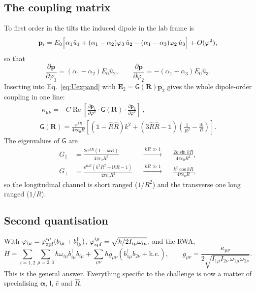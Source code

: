 \documentclass[11pt,a4paper]{article}
\newcommand{\ee}{\mathrm{e}}
\newcommand{\ii}{\mathrm{i}}
\newcommand{\bal}{\boldsymbol{\alpha}}
\newcommand{\Gsf}{\mathsf{G}}
\begin{document}
\subsection{The coupling matrix}

To first order in the tilts the induced dipole in the lab frame is
\begin{equation}
  \mathbf p_i=E_0\Bigl[\alpha_1\hat u_1
  +(\alpha_1-\alpha_2)\varphi_3\,\hat u_2
  -(\alpha_1-\alpha_3)\varphi_2\,\hat u_3\Bigr]+O(\varphi^{2}),
  \label{eq:dpdphi}
\end{equation}
so that
\begin{equation}
  \frac{\partial\mathbf p}{\partial\varphi_3}=(\alpha_1-\alpha_2)E_0\hat u_2,
  \qquad
  \frac{\partial\mathbf p}{\partial\varphi_2}=-(\alpha_1-\alpha_3)E_0\hat u_3 .
  \label{eq:dpdphi2}
\end{equation}
Inserting into Eq.~\eqref{eq:Uexpand} with $\mathbf E_2=\Gsf(\mathbf R)\mathbf p_2$
gives the whole dipole-order coupling in one line:
\begin{gather}
  \boxed{\;
  \kappa_{\mu\nu}=-C\operatorname{Re}
  \left[\frac{\partial\mathbf p_1}{\partial\varphi^{\mu}}\cdot
  \Gsf(\mathbf R)\cdot
  \frac{\partial\mathbf p_2}{\partial\varphi^{\nu}}\right]\;},
  \label{eq:kappa}\\[4pt]
  \Gsf(\mathbf R)=\frac{\ee^{\ii kR}}{4\pi\epsilon_0R}
  \left[\left(\mathbb 1-\hat R\hat R\right)k^{2}
  +\left(3\hat R\hat R-\mathbb 1\right)
  \left(\frac{1}{R^{2}}-\frac{\ii k}{R}\right)\right].
  \label{eq:Gdyad}
\end{gather}
The eigenvalues of $\Gsf$ are
\begin{align}
  G_{\parallel}&=\frac{2\ee^{\ii kR}(1-\ii kR)}{4\pi\epsilon_0R^{3}}
  &&\xrightarrow{\ kR\gg1\ }&&\frac{2k\sin kR}{4\pi\epsilon_0R^{2}},
  \label{eq:Gpar}\\
  G_{\perp}&=\frac{\ee^{\ii kR}(k^{2}R^{2}+\ii kR-1)}{4\pi\epsilon_0R^{3}}
  &&\xrightarrow{\ kR\gg1\ }&&\frac{k^{2}\cos kR}{4\pi\epsilon_0R},
  \label{eq:Gperp}
\end{align}
so the longitudinal channel is short ranged ($1/R^{2}$) and the transverse one
long ranged ($1/R$).

\subsection{Second quantisation}

With $\varphi_{i\mu}=\varphi_{\rm zpf}^{i\mu}(b_{i\mu}+b_{i\mu}^{\dagger})$,
$\varphi_{\rm zpf}^{i\mu}=\sqrt{\hbar/2I_{i\mu}\omega_{i\mu}}$, and the RWA,
\begin{equation}
  H=\sum_{i=1,2}\sum_{\mu=2,3}\hbar\omega_{i\mu}b_{i\mu}^{\dagger}b_{i\mu}
   +\sum_{\mu\nu}\hbar g_{\mu\nu}
    \left(b_{1\mu}^{\dagger}b_{2\nu}+\mathrm{h.c.}\right),
  \qquad
  g_{\mu\nu}=\frac{\kappa_{\mu\nu}}
  {2\sqrt{I_{1\mu}I_{2\nu}\,\omega_{1\mu}\omega_{2\nu}}} .
  \label{eq:Hgen}
\end{equation}
This is the general answer.  Everything specific to the challenge is now a
matter of specialising $\bal$, $\mathsf I$, $\hat e$ and $\hat R$.
\end{document}
